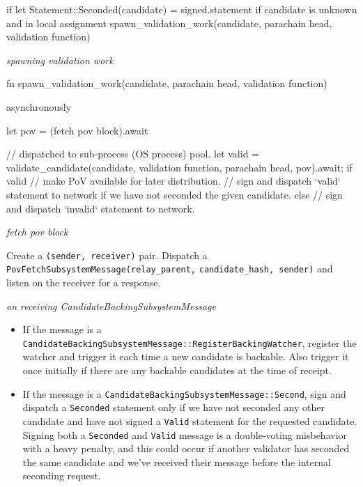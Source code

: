 \begin{verbnobox}[\small]
if let Statement::Seconded(candidate) = signed.statement {
  if candidate is unknown and in local assignment {
    spawn_validation_work(candidate, parachain head, validation function)
  }
}
\end{verbnobox}

\textit{spawning validation work}

\begin{verbnobox}[\small]
fn spawn_validation_work(candidate, parachain head, validation function) {
  asynchronously {
    let pov = (fetch pov block).await

    // dispatched to sub-process (OS process) pool.
    let valid = validate_candidate(candidate, validation function, parachain head, pov).await;
    if valid {
      // make PoV available for later distribution.
      // sign and dispatch `valid` statement to network if we have not seconded the given candidate.
    } else {
      // sign and dispatch `invalid` statement to network.
    }
  }
}
\end{verbnobox}

\textit{fetch pov block}
\newline

Create a \verb|(sender, receiver)| pair. Dispatch a \verb|PovFetchSubsystemMessage(relay_parent,|
\verb|candidate_hash, sender)| and listen on the receiver for a response.
\newline

\textit{on receiving CandidateBackingSubsystemMessage}

\begin{itemize}
    \item If the message is a
    \verb|CandidateBackingSubsystemMessage::RegisterBackingWatcher|, register the
    watcher and trigger it each time a new candidate is backable. Also trigger
    it once initially if there are any backable candidates at the time of
    receipt.
    \item If the message is a \verb|CandidateBackingSubsystemMessage::Second|,
    sign and dispatch a \verb|Seconded| statement only if we have not seconded
    any other candidate and have not signed a \verb|Valid| statement for the
    requested candidate. Signing both a \verb|Seconded| and \verb|Valid| message
    is a double-voting misbehavior with a heavy penalty, and this could occur if
    another validator has seconded the same candidate and we've received their
    message before the internal seconding request.
\end{itemize}

\newline
{}
